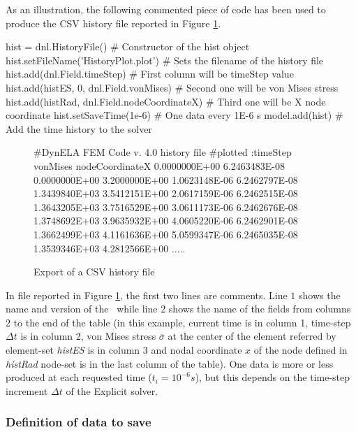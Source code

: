 As an illustration, the following commented piece of code has been used to produce the CSV history file reported in Figure \ref{fig:PL!HF!Export}.
\begin{PythonListing}
hist = dnl.HistoryFile()              # Constructor of the hist object
hist.setFileName('HistoryPlot.plot')  # Sets the filename of the history file
hist.add(dnl.Field.timeStep)                 # First column will be timeStep value
hist.add(histES, 0, dnl.Field.vonMises)      # Second one will be von Mises stress
hist.add(histRad, dnl.Field.nodeCoordinateX) # Third one will be X node coordinate
hist.setSaveTime(1e-6)                       # One data every 1E-6 s
model.add(hist)                              # Add the time history to the solver
\end{PythonListing}

\begin{figure}[h]
\begin{centering}
\begin{BashListing}
#DynELA FEM Code v. 4.0 history file
#plotted :timeStep vonMises nodeCoordinateX 
0.0000000E+00 6.2463483E-08 0.0000000E+00 3.2000000E+00 
1.0623148E-06 6.2462797E-08 1.3439840E+03 3.5412151E+00 
2.0617159E-06 6.2462515E-08 1.3643205E+03 3.7516529E+00 
3.0611173E-06 6.2462676E-08 1.3748692E+03 3.9635932E+00 
4.0605220E-06 6.2462901E-08 1.3662499E+03 4.1161636E+00 
5.0599347E-06 6.2465035E-08 1.3539346E+03 4.2812566E+00 
.....
\end{BashListing}
\par\end{centering}
\caption{Export of a CSV history file\label{fig:PL!HF!Export}}
\end{figure}

In file reported in Figure \ref{fig:PL!HF!Export}, the first two lines are comments. Line $1$ shows the name and version of the \DynELA~while line $2$ shows the name of the fields from columns 2 to the end of the table (in this example, current time is in column 1, time-step $\Delta t$ is in column 2, von Mises stress $\overline{\sigma}$ at the center of the element referred by element-set \emph{histES} is in column 3 and nodal coordinate $x$ of the node defined in \emph{histRad} node-set is in the last column of the table). One data is more or less produced at each requested time ($t_i=10^{-6}s$), but this depends on the time-step increment $\Delta t$ of the Explicit solver.

\subsubsection{Definition of data to save}

